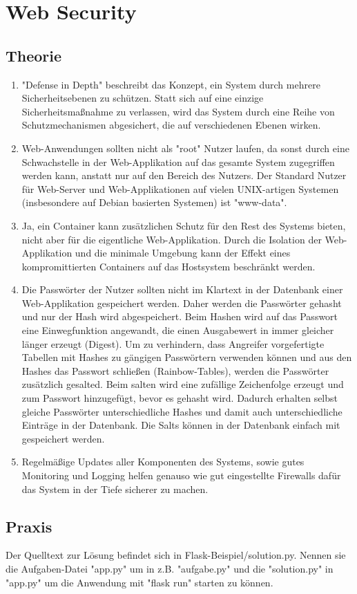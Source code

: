 \documentclass[ngerman]{article}
\begin{document}
\section{Web Security}

\subsection{Theorie}
\begin{enumerate}
    \item "Defense in Depth" beschreibt das Konzept, ein System durch mehrere Sicherheitsebenen zu schützen. Statt sich auf eine einzige Sicherheitsmaßnahme zu verlassen, wird das System durch eine Reihe von Schutzmechanismen abgesichert, die auf verschiedenen Ebenen wirken.
    
    \item Web-Anwendungen sollten nicht als "root" Nutzer laufen, da sonst durch eine Schwachstelle in der Web-Applikation auf das gesamte System zugegriffen werden kann, anstatt nur auf den Bereich des Nutzers. Der Standard Nutzer für Web-Server und Web-Applikationen auf vielen UNIX-artigen Systemen (insbesondere auf Debian basierten Systemen) ist "www-data".
    
    \item Ja, ein Container kann zusätzlichen Schutz für den Rest des Systems bieten, nicht aber für die eigentliche Web-Applikation. Durch die Isolation der Web-Applikation und die minimale Umgebung kann der Effekt eines kompromittierten Containers auf das Hostsystem beschränkt werden.
    
    \item Die Passwörter der Nutzer sollten nicht im Klartext in der Datenbank einer Web-Applikation gespeichert werden. Daher werden die Passwörter gehasht und nur der Hash wird abgespeichert. Beim Hashen wird auf das Passwort eine Einwegfunktion angewandt, die einen Ausgabewert in immer gleicher länger erzeugt (Digest). Um zu verhindern, dass Angreifer vorgefertigte Tabellen mit Hashes zu gängigen Passwörtern verwenden können und aus den Hashes das Passwort schließen (Rainbow-Tables), werden die Passwörter zusätzlich gesalted. Beim salten wird eine zufällige Zeichenfolge erzeugt und zum Passwort hinzugefügt, bevor es gehasht wird. Dadurch erhalten selbst gleiche Passwörter unterschiedliche Hashes und damit auch unterschiedliche Einträge in der Datenbank. Die Salts können in der Datenbank einfach mit gespeichert werden.

    \item Regelmäßige Updates aller Komponenten des Systems, sowie gutes Monitoring und Logging helfen genauso wie gut eingestellte Firewalls dafür das System in der Tiefe sicherer zu machen.
    
\end{enumerate}

\subsection{Praxis}

Der Quelltext zur Lösung befindet sich in Flask-Beispiel/solution.py. Nennen sie die Aufgaben-Datei "app.py" um in z.B. "aufgabe.py" und die "solution.py" in "app.py" um die Anwendung mit "flask run" starten zu können. 
\end{document}

